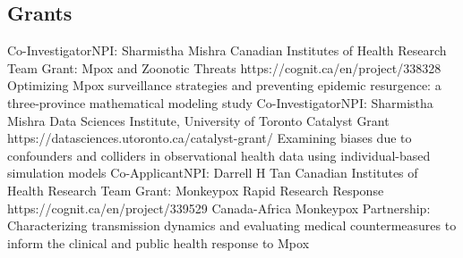 \subsection{Grants}
  {Co-Investigator}{NPI: Sharmistha Mishra }
  {Canadian Institutes of Health Research}
  {Team Grant: Mpox and Zoonotic Threats}
  {https://cognit.ca/en/project/338328}
  {Optimizing Mpox surveillance strategies and preventing epidemic resurgence: a three-province mathematical modeling study }
  {Co-Investigator}{NPI: Sharmistha Mishra }
  {Data Sciences Institute, University of Toronto}
  {Catalyst Grant}
  {https://datasciences.utoronto.ca/catalyst-grant/}
  {Examining biases due to confounders and colliders in observational health data using individual-based simulation models}
  {Co-Applicant}{NPI: Darrell H Tan }
  {Canadian Institutes of Health Research}
  {Team Grant: Monkeypox Rapid Research Response}
  {https://cognit.ca/en/project/339529}
  {Canada-Africa Monkeypox Partnership: Characterizing transmission dynamics and evaluating medical countermeasures to inform the clinical and public health response to Mpox}
